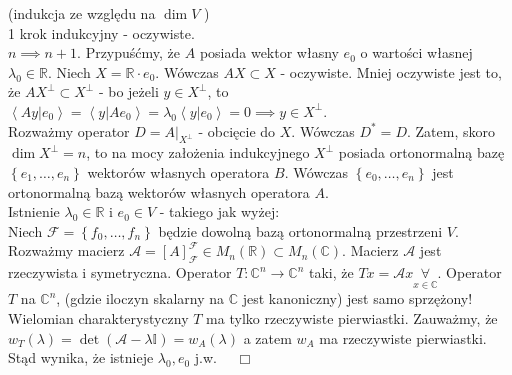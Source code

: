 \documentclass[../main.tex]{subfiles}
\begin{document}
    \begin{dowod}
        (indukcja ze względu na $\dim V$ )\\
        1 krok indukcyjny - oczywiste.\\
        $n\implies n+1$. Przypuśćmy, że $A$ posiada wektor własny $e_0$ o wartości własnej $\lambda_0\in\mathbb{R}$. Niech $X = \mathbb{R}\cdot e_0$.
        Wówczas $A X\subset X$ - oczywiste. Mniej oczywiste jest to, że $A X^\perp \subset X^\perp$ - bo jeżeli $y\in X^\perp$, to $\left<Ay|e_0 \right> = \left<y|Ae_0 \right> = \lambda_0 \left<y|e_0 \right> = 0 \implies y\in X^\perp$.\\
        Rozważmy operator $D = A|_{X^\perp}$ - obcięcie do $X$. Wówczas $D^* = D$. Zatem, skoro $\dim X^\perp = n$, to na mocy założenia indukcyjnego $X^\perp$ posiada ortonormalną bazę $\left\{ e_1,\ldots,e_n \right\} $ wektorów własnych operatora $B$. Wówczas $\left\{ e_0,\ldots,e_n \right\} $ jest ortonormalną bazą wektorów własnych operatora $A$.\\
        Istnienie $\lambda_0\in \mathbb{R}$ i $e_0\in V$ - takiego jak wyżej:\\
        Niech $\mathcal{F} = \left\{ f_0,\ldots,f_n \right\} $ będzie dowolną bazą ortonormalną przestrzeni $V$. Rozważmy macierz $\mathcal{A} = \left[ A \right] _\mathcal{F}^\mathcal{F}\in M_n(\mathbb{R})\subset M_n(\mathbb{C})$. Macierz $\mathcal{A}$ jest rzeczywista i symetryczna. Operator $T: \mathbb{C}^n\to \mathbb{C}^n$ taki, że $T x = \mathcal{A} x \underset{x\in \mathbb{C}}{\forall} $. Operator $T$ na $\mathbb{C}^n$, (gdzie iloczyn skalarny na $\mathbb{C}$ jest kanoniczny) jest samo sprzężony!\\
        Wielomian charakterystyczny $T$ ma tylko rzeczywiste pierwiastki. Zauważmy, że $w_T(\lambda) = \det (\mathcal{A} - \lambda \mathbb{I}) = w_A(\lambda)$ a zatem $w_A$ ma rzeczywiste pierwiastki. Stąd wynika, że istnieje $\lambda_0,e_0$ j.w. $\quad\Box$
    \end{dowod}
\end{document}
